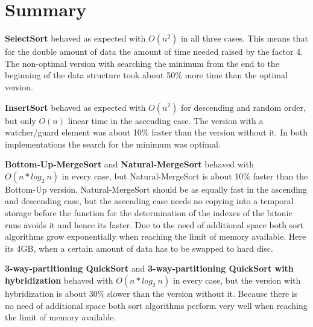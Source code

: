 \documentclass[11pt]{amsart}
\begin{document}
\section{Summary}
%
%
\textbf{SelectSort} behaved as expected with $O(n^2)$ in all three cases. This means that for the double amount of data the amount of time needed raised by the factor 4. The non-optimal version with searching the minimum from the end to the beginning of the data structure took about 50\% more time than the optimal version.

\textbf{InsertSort} behaved as expected with $O(n^2)$ for descending and random order, but only $O(n)$ linear time in the ascending case. The version with a watcher/guard element was about 10\% faster than the version without it. In both implementations the search for the minimum was optimal.

\textbf{Bottom-Up-MergeSort} and \textbf{Natural-MergeSort}  behaved with $O(n*log_2~n)$ in every case, but Natural-MergeSort is about 10\% faster than the Bottom-Up version. Natural-MergeSort should be as equally fast in the ascending and descending case, but the ascending case needs no copying into a temporal storage before the function for the determination of the indexes of the bitonic runs avoids it and hence its faster. Due to the need of additional space both sort algorithms grow exponentially when reaching the limit of memory available. Here its 4GB, when a certain amount of data has to be swapped to hard disc.

\textbf{3-way-partitioning QuickSort} and \textbf{3-way-partitioning QuickSort with hybridization} behaved with $O(n*log_2~n)$ in every case, but the version with hybridization is about 30\% slower than the version without it. Because there is no need of additional space both sort algorithms perform very well when reaching the limit of memory available.
\end{document}

